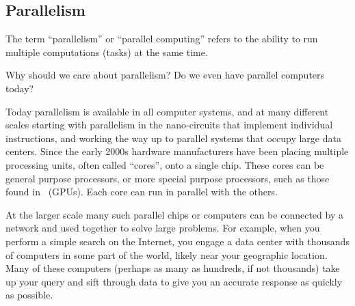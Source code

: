 \subsection{Parallelism}

\begin{gram}
The term ``parallelism'' or ``parallel computing'' refers to the
ability to run multiple computations (tasks) at the same time.
%
\end{gram}

\begin{teachask}
Why should we care about parallelism?  
%
Do we even have parallel computers today? 
\end{teachask}
%

%
\begin{gram}
Today parallelism is available in all computer systems, and at many
different scales starting with parallelism in the nano-circuits that
implement individual instructions, and working the way up to parallel
systems that occupy large data centers.  Since the early 2000s
hardware manufacturers have been placing multiple processing units,
often called ``cores'', onto a single chip.  These cores can be
general purpose processors, or more special purpose processors, such as
those found in~ (GPUs).  Each core can
run in parallel with the others.  

At the larger scale many such parallel chips or computers can be
connected by a network and used together to solve large problems.  For
example, when you perform a simple search on the Internet, you engage
a data center with thousands of computers in some part of the world,
likely near your geographic location.
%
Many of these computers (perhaps as many as hundreds, if not
thousands) take up your query and sift through data to give you an
accurate response as quickly as possible.







\end{gram}
